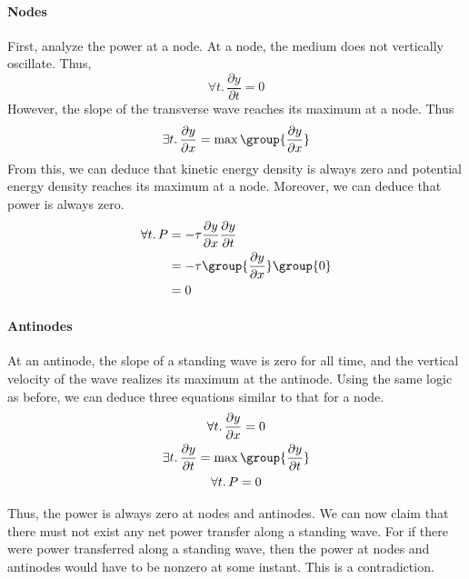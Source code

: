 \documentclass{hw}
\numberwithin{equation}{section}
\begin{document}
\paragraph{Nodes} First, analyze the power at a node. At a node, the medium
does not vertically oscillate. Thus,
\begin{equation}
  \forall t.\, \frac{\partial y}{\partial t} = 0
\end{equation}
However, the slope of the transverse wave reaches its maximum at a node. Thus 
\begin{equation}
  \exists t.\, 
  \frac{\partial y}{\partial x} = \max \group{\frac{\partial y}{\partial x}}
\end{equation}
From this, we can deduce that kinetic energy density is always zero and potential
energy density reaches its maximum at a node. Moreover, we can deduce that
power is always zero.
\begin{align}
  \forall t.\, P &= -\tau \frac{\partial y}{\partial x} 
                          \frac{\partial y}{\partial t}                   \\
                 &= -\tau \group{\frac{\partial y}{\partial x}} \group{0} \\
                 &= 0
\end{align}

\paragraph{Antinodes}
At an antinode, the slope of a standing wave is zero for all time, and the
vertical velocity of the wave realizes its maximum at the antinode. Using the
same logic as before, we can deduce three equations similar to that for a node.
\begin{gather}
  \forall t.\, 
    \frac{\partial y}{\partial x} = 0 \\
  \exists t.\, 
    \frac{\partial y}{\partial t} = \max \group{\frac{\partial y}{\partial t}} \\
  \forall t.\, 
    P = 0
\end{gather}

Thus, the power is always zero at nodes and antinodes. We can now claim that
there must not exist any net power transfer along a standing wave. For if there
were power transferred along a standing wave, then the power at nodes and
antinodes would have to be nonzero at some instant. This is a contradiction.

\end{document}
